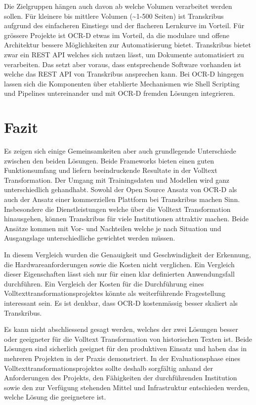 \documentclass[a4paper,oneside, 12pt]{report}
\begin{document}
Die Zielgruppen hängen auch davon ab welche Volumen verarbeitet werden sollen. Für kleinere bis mittlere Volumen (\textasciitilde1-500 Seiten) ist Transkribus aufgrund des einfacheren Einstiegs und der flacheren Lernkurve im Vorteil. Für grössere Projekte ist OCR-D etwas im Vorteil, da die modulare und offene Architektur bessere Möglichkeiten zur Automatisierung bietet. Transkribus bietet zwar ein REST API welches sich nutzen lässt, um Dokumente automatisiert zu verarbeiten. Das setzt aber voraus, dass entsprechende Software vorhanden ist welche das REST API von Transkribus ansprechen kann. Bei OCR-D hingegen lassen sich die Komponenten über etablierte Mechanismen wie Shell Scripting und Pipelines untereinander und mit OCR-D fremden Lösungen integrieren.

\section{Fazit}
Es zeigen sich einige Gemeinsamkeiten aber auch grundlegende Unterschiede zwischen den beiden Lösungen. Beide Frameworks bieten einen guten Funktionsumfang und liefern beeindruckende Resultate in der Volltext Transformation. Der Umgang mit Trainingsdaten und Modellen wird ganz unterschiedlich gehandhabt. Sowohl der Open Source Ansatz von OCR-D als auch der Ansatz einer kommerziellen Plattform bei Transkribus machen Sinn. Insbesondere die Dienstleistungen welche über die Volltext Transformation hinausgehen, können Transkribus für viele Institutionen attraktiv machen. Beide Ansätze kommen mit Vor- und Nachteilen welche je nach Situation und Ausgangslage unterschiedliche gewichtet werden müssen. 

In diesem Vergleich wurden die Genauigkeit und Geschwindigkeit der Erkennung, die Hardwareanforderungen sowie die Kosten nicht verglichen. Ein Vergleich dieser Eigenschaften lässt sich nur für einen klar definierten Anwendungsfall durchführen. Ein Vergleich der Kosten für die Durchführung eines Volltexttransformationsprojektes könnte als weiterführende Fragestellung interessant sein. Es ist denkbar, dass OCR-D kostenmässig besser skaliert als Transkribus.

Es kann nicht abschliessend gesagt werden, welches der zwei Lösungen besser oder geeigneter für die Volltext Transformation von historischen Texten ist. Beide Lösungen sind sicherlich geeignet für den produktiven Einsatz und haben das in mehreren Projekten in der Praxis demonstriert. In der Evaluationsphase eines Volltexttransformationsprojektes sollte deshalb sorgfältig anhand der Anforderungen des Projekts, den Fähigkeiten der durchführenden Institution sowie den zur Verfügung stehenden Mittel und Infrastruktur entschieden werden, welche Lösung die geeignetere ist.
\end{document}
